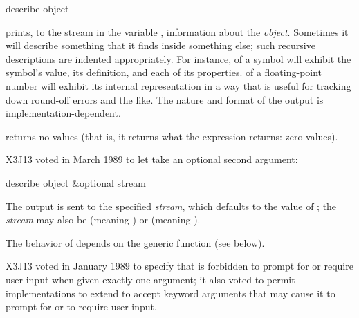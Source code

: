 \begin{obsolete}
\begin{defun}[Function]
describe object

 prints, to the stream in the variable ,
information about the {\it object}.  Sometimes
it will describe something that it finds inside something else;
such recursive descriptions are indented appropriately.  For instance,
 of a symbol will exhibit the symbol's value,
its definition, and each of its properties.   of a
floating-point number will exhibit its internal representation in a way
that is useful for tracking down round-off errors and the like.
The nature and format of the output is implementation-dependent.

 returns no values (that is, it returns what the expression
 returns: zero values).
\end{defun}
\end{obsolete}

\begin{newer}
X3J13 voted in March 1989 
to let  take an optional second argument:

\begin{defun}[Function]
describe object &optional stream

The output is sent to the specified {\it stream}, which
 defaults to the value of ;
 the {\it stream} may also be  (meaning )
 or  (meaning ).

The behavior of  depends on the generic function
 (see below).
\end{defun}
\end{newer}

\begin{new}
X3J13 voted in January 1989
to specify that  is forbidden
to prompt for or require user input when given exactly one argument;
it also voted to permit implementations
to extend  to accept keyword arguments that may cause
it to prompt for or to require user input.
\end{new}

